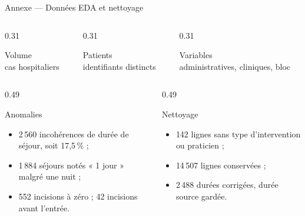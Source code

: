 \begin{frame}{Annexe --- Données EDA et nettoyage}
  \scriptsize
  \begin{columns}[T,onlytextwidth]
    \begin{column}{0.31\textwidth}
      \begin{exampleblock}{Volume}
        \\ cas hospitaliers
      \end{exampleblock}
    \end{column}
    \begin{column}{0.31\textwidth}
      \begin{block}{Patients}
        \\ identifiants distincts
      \end{block}
    \end{column}
    \begin{column}{0.31\textwidth}
      \begin{alertblock}{Variables}
        \\ administratives, cliniques, bloc
      \end{alertblock}
    \end{column}
  \end{columns}

  \vspace{0.15cm}
  \begin{columns}[T,onlytextwidth]
    \begin{column}{0.49\textwidth}
      \begin{block}{Anomalies}
        \begin{itemize}
          \item 2\,560 incohérences de durée de séjour, soit 17,5\,\% ;
          \item 1\,884 séjours notés « 1 jour » malgré une nuit ;
          \item 552 incisions à zéro ; 42 incisions avant l'entrée.
        \end{itemize}
      \end{block}
    \end{column}
    \begin{column}{0.49\textwidth}
      \begin{exampleblock}{Nettoyage}
        \begin{itemize}
          \item 142 lignes sans type d'intervention ou praticien ;
          \item 14\,507 lignes conservées ;
          \item 2\,488 durées corrigées, durée source gardée.
        \end{itemize}
      \end{exampleblock}
    \end{column}
  \end{columns}
\end{frame}

